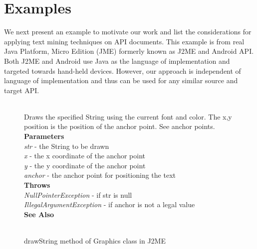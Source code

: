 \section{Examples}
\label{sec:example}

We next present an example to motivate our work and list the considerations for applying text mining techniques on API documents. 
This example is from real Java Platform, Micro Edition (JME) formerly known as J2ME and Android API. Both J2ME and Android use Java as the language of implementation and targeted towards hand-held devices. However, our approach is independent of language of implementation and thus can be used for any similar source and target API.  


\begin{figure}
	\begin{framed}
		\begin{small}
			\\
			Draws the specified String using the current font and color. The x,y position is the position of the anchor point. See anchor points.\\
			\textbf{Parameters}\\
			\textit{str} - the String to be drawn\\
			\textit{x} - the x coordinate of the anchor point\\
			\textit{y} - the y coordinate of the anchor point\\
			\textit{anchor} - the anchor point for positioning the text\\
			\textbf{Throws}\\
			\textit{NullPointerException} - if str is null\\
			\textit{IllegalArgumentException} - if anchor is not a legal value\\
			\textbf{See Also}\\
			\\
		\end{small}
	\end{framed}
	\caption{drawString method of Graphics class in J2ME}
	\label{fig:drawStringJavadoc}
\end{figure}



